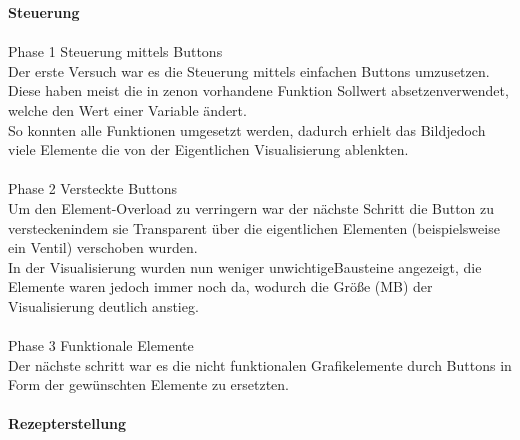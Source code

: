 \textbf{Steuerung}\\
\\
Phase 1 Steuerung mittels Buttons\\
	Der erste Versuch war es die Steuerung mittels einfachen Buttons umzusetzen. Diese haben meist die in zenon vorhandene Funktion  \glqq Sollwert absetzen\grqq\space  verwendet, welche den Wert einer Variable ändert.\\
	So konnten alle Funktionen umgesetzt werden, dadurch erhielt das  \glqq Bild\grqq\space  jedoch viele Elemente die von der Eigentlichen Visualisierung ablenkten.\\
\\
Phase 2 Versteckte Buttons\\
	Um den Element-Overload zu verringern war der nächste Schritt die Button zu  \glqq verstecken\grqq\space  indem sie Transparent über die eigentlichen Elementen (beispielsweise ein Ventil) verschoben wurden.\\
	In der Visualisierung wurden nun weniger  \glqq unwichtige\grqq\space  Bausteine angezeigt, die Elemente waren jedoch immer noch da, wodurch die Größe (MB) der Visualisierung deutlich anstieg.\\
\\
Phase 3 Funktionale Elemente\\
	Der nächste schritt war es die nicht funktionalen Grafikelemente durch Buttons in Form der gewünschten Elemente zu ersetzten.\\
\\
\textbf{Rezepterstellung}\\

